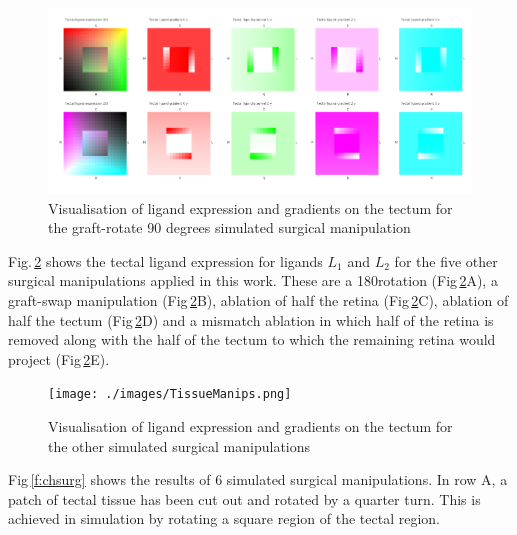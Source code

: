 \documentclass[11pt, a4paper]{article}
\begin{document}
%
\begin{figure}
\includegraphics[width=\linewidth]{./images/Tissuevisb.png}
\caption{Visualisation of ligand expression and gradients on the tectum for the
graft-rotate 90 degrees simulated surgical manipulation}
\label{f:trot90}
\end{figure}

Fig.\,\ref{f:tmanip} shows the tectal ligand expression for ligands $L_1$ and
$L_2$ for the five other surgical manipulations applied in this work. These
are a 180\degree rotation (Fig\,\ref{f:tmanip}A), a graft-swap manipulation
(Fig\,\ref{f:tmanip}B), ablation of half the retina  (Fig\,\ref{f:tmanip}C),
ablation of half the tectum (Fig\,\ref{f:tmanip}D) and a mismatch ablation in
which half of the retina is removed along with the half of the tectum to which
the remaining retina would project (Fig\,\ref{f:tmanip}E).

\begin{figure}
\texttt{[image: ./images/TissueManips.png]}
\caption{Visualisation of ligand expression and gradients on the tectum for the
other simulated surgical manipulations}
\label{f:tmanip}
\end{figure}

Fig\,\ref{f:chsurg} shows the
results of 6 simulated surgical manipulations. In row A, a patch of tectal
tissue has been cut out and rotated by a quarter turn. This is achieved in
simulation by rotating a square region of the tectal region.
\end{document}
